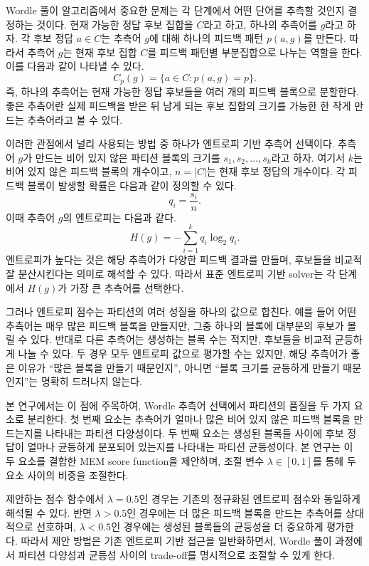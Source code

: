 \documentclass[11pt]{article}
\begin{document}
Wordle 풀이 알고리즘에서 중요한 문제는 각 단계에서 어떤 단어를 추측할 것인지 결정하는 것이다.
현재 가능한 정답 후보 집합을 $C$라고 하고, 하나의 추측어를 $g$라고 하자.
각 후보 정답 $a \in C$는 추측어 $g$에 대해 하나의 피드백 패턴 $p(a,g)$를 만든다.
따라서 추측어 $g$는 현재 후보 집합 $C$를 피드백 패턴별 부분집합으로 나누는 역할을 한다.
이를 다음과 같이 나타낼 수 있다.
\[
C_p(g) = \{ a \in C : p(a,g) = p \}.
\]
즉, 하나의 추측어는 현재 가능한 정답 후보들을 여러 개의 피드백 블록으로 분할한다.
좋은 추측어란 실제 피드백을 받은 뒤 남게 되는 후보 집합의 크기를 가능한 한 작게 만드는 추측어라고 볼 수 있다.

이러한 관점에서 널리 사용되는 방법 중 하나가 엔트로피 기반 추측어 선택이다.
추측어 $g$가 만드는 비어 있지 않은 파티션 블록의 크기를 $s_1, s_2, \ldots, s_k$라고 하자.
여기서 $k$는 비어 있지 않은 피드백 블록의 개수이고, $n = |C|$는 현재 후보 정답의 개수이다.
각 피드백 블록이 발생할 확률은 다음과 같이 정의할 수 있다.
\[
q_i = \frac{s_i}{n}.
\]
이때 추측어 $g$의 엔트로피는 다음과 같다.
\[
H(g) = - \sum_{i=1}^{k} q_i \log_2 q_i.
\]
엔트로피가 높다는 것은 해당 추측어가 다양한 피드백 결과를 만들며, 후보들을 비교적 잘 분산시킨다는 의미로 해석할 수 있다.
따라서 표준 엔트로피 기반 solver는 각 단계에서 $H(g)$가 가장 큰 추측어를 선택한다.

그러나 엔트로피 점수는 파티션의 여러 성질을 하나의 값으로 합친다.
예를 들어 어떤 추측어는 매우 많은 피드백 블록을 만들지만, 그중 하나의 블록에 대부분의 후보가 몰릴 수 있다.
반대로 다른 추측어는 생성하는 블록 수는 적지만, 후보들을 비교적 균등하게 나눌 수 있다.
두 경우 모두 엔트로피 값으로 평가할 수는 있지만, 해당 추측어가 좋은 이유가 ``많은 블록을 만들기 때문인지'', 아니면 ``블록 크기를 균등하게 만들기 때문인지''는 명확히 드러나지 않는다.

본 연구에서는 이 점에 주목하여, Wordle 추측어 선택에서 파티션의 품질을 두 가지 요소로 분리한다.
첫 번째 요소는 추측어가 얼마나 많은 비어 있지 않은 피드백 블록을 만드는지를 나타내는 파티션 다양성이다.
두 번째 요소는 생성된 블록들 사이에 후보 정답이 얼마나 균등하게 분포되어 있는지를 나타내는 파티션 균등성이다.
본 연구는 이 두 요소를 결합한 MEM score function을 제안하며, 조절 변수 $\lambda \in [0,1]$를 통해 두 요소 사이의 비중을 조절한다.

제안하는 점수 함수에서 $\lambda = 0.5$인 경우는 기존의 정규화된 엔트로피 점수와 동일하게 해석될 수 있다.
반면 $\lambda > 0.5$인 경우에는 더 많은 피드백 블록을 만드는 추측어를 상대적으로 선호하며, $\lambda < 0.5$인 경우에는 생성된 블록들의 균등성을 더 중요하게 평가한다.
따라서 제안 방법은 기존 엔트로피 기반 접근을 일반화하면서, Wordle 풀이 과정에서 파티션 다양성과 균등성 사이의 trade-off를 명시적으로 조절할 수 있게 한다.
\end{document}
